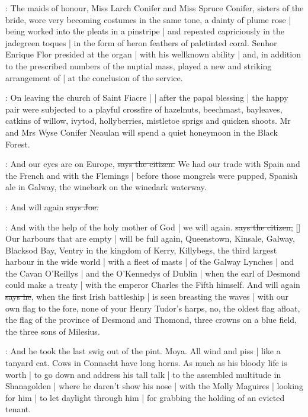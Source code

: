 :
The maids of honour,
Miss Larch Conifer and Miss Spruce Conifer,
sisters of the bride,
wore very becoming costumes in the same tone,
a dainty  of plume rose |
being worked into the pleats in a pinstripe |
and repeated capriciously in the jadegreen toques |
in the form of heron feathers of paletinted coral.
Senhor Enrique Flor presided at the organ |
with his wellknown ability |
and,
in addition to the prescribed numbers of the nuptial mass,
played a new and striking arrangement of
 |
at the conclusion of the service.

:
On leaving the church of Saint Fiacre |
 |
after the papal blessing |
the happy pair were subjected to a playful crossfire of hazelnuts,
beechmast,
bayleaves,
catkins of willow,
ivytod,
hollyberries,
mistletoe sprigs
and quicken shoots.
Mr and Mrs Wyse Conifer Neaulan will spend a quiet honeymoon in the Black Forest.

\citizen:
And our eyes are on Europe,
\sout{says the citizen.}
We had our trade with Spain and the French and with the Flemings |
before those mongrels were pupped,
Spanish ale in Galway,
the winebark on the winedark waterway.

\joe:
And will again
\sout{says Joe.}

\citizen:
And with the help of the holy mother of God |
we will again.
\sout{says the citizen,}
[]
Our harbours that are empty |
will be full again,
Queenstown,
Kinsale,
Galway,
Blacksod Bay,
Ventry in the kingdom of Kerry,
Killybegs,
the third largest harbour in the wide world |
with a fleet of masts |
of the Galway Lynches |
and the Cavan O'Reillys |
and the O'Kennedys of Dublin |
when the earl of Desmond
could make a treaty |
with the emperor Charles the Fifth himself.
And will again
\sout{says he},
when the first Irish battleship |
is seen breasting the waves |
with our own flag to the fore,
none of your Henry Tudor's harps,
no,
the oldest flag afloat,
the flag of the province of Desmond and Thomond,
three crowns on a blue field,
the three sons of Milesius.%

\Nq:
And he took the last swig out of the pint.
Moya.
All wind and piss |
like a tanyard cat.
Cows in Connacht have long horns.
As much as his bloody life is worth |
to go down and address his tall talk |
to the assembled multitude in Shanagolden |
where he daren't show his nose |
with the Molly Maguires |
looking for him |
to let daylight through him |
for grabbing the holding of an evicted tenant.

